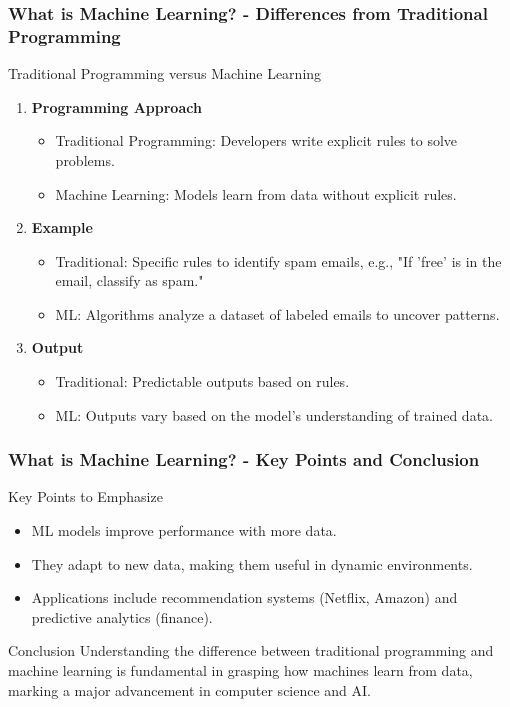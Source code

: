 \documentclass[aspectratio=169]{beamer}
\begin{document}
\begin{frame}[fragile]
    \frametitle{What is Machine Learning? - Differences from Traditional Programming}
    \begin{block}{Traditional Programming versus Machine Learning}
        \begin{enumerate}
            \item \textbf{Programming Approach}
                \begin{itemize}
                    \item Traditional Programming: Developers write explicit rules to solve problems.
                    \item Machine Learning: Models learn from data without explicit rules.
                \end{itemize}
            \item \textbf{Example}
                \begin{itemize}
                    \item Traditional: Specific rules to identify spam emails, e.g., "If 'free' is in the email, classify as spam."
                    \item ML: Algorithms analyze a dataset of labeled emails to uncover patterns.
                \end{itemize}
            \item \textbf{Output}
                \begin{itemize}
                    \item Traditional: Predictable outputs based on rules.
                    \item ML: Outputs vary based on the model's understanding of trained data.
                \end{itemize}
        \end{enumerate}
    \end{block}
\end{frame}

\begin{frame}[fragile]
    \frametitle{What is Machine Learning? - Key Points and Conclusion}
    \begin{block}{Key Points to Emphasize}
        \begin{itemize}
            \item ML models improve performance with more data.
            \item They adapt to new data, making them useful in dynamic environments.
            \item Applications include recommendation systems (Netflix, Amazon) and predictive analytics (finance).
        \end{itemize}
    \end{block}
    \begin{block}{Conclusion}
        Understanding the difference between traditional programming and machine learning is fundamental in grasping how machines learn from data, marking a major advancement in computer science and AI.
    \end{block}
\end{frame}
\end{document}
